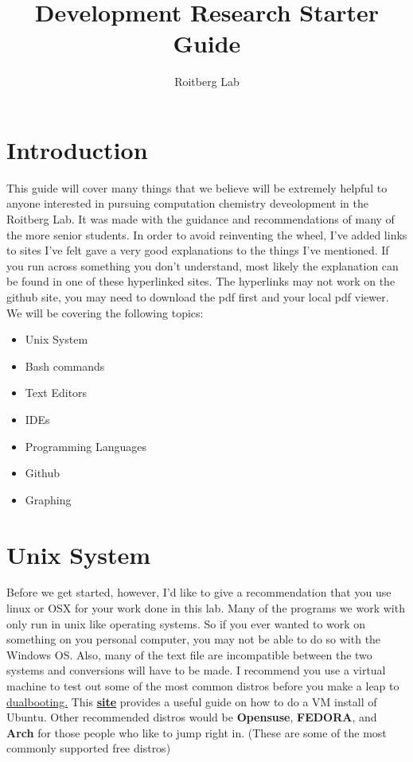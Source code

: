 \documentclass{article}
\begin{document}
\title{Development Research Starter Guide}
\author{Roitberg Lab}
\maketitle

\section*{Introduction}

This guide will cover many things that we believe will be extremely helpful to anyone interested in pursuing computation chemistry deveolopment in the Roitberg Lab. 
It was made with the guidance and recommendations of many of the more senior students. 
In order to avoid reinventing the wheel, I've added links to sites I've felt gave a very good explanations to the things I've mentioned.
If you run across something you don't understand, most likely the explanation can be found in one of these hyperlinked sites.
The hyperlinks may not work on the github site, you may need to download the pdf first and your local pdf viewer.
We will be covering the following topics: \\

\begin{itemize}
\item Unix System
\item Bash commands
\item Text Editors
\item IDEs
\item Programming Languages
\item Github
\item Graphing
\end{itemize}

\section*{Unix System}
Before we get started, however, I'd like to give a recommendation that you use linux or OSX for your work done in this lab. 
Many of the programs we work with only run in unix like operating systems.
So if you ever wanted to work on something on you personal computer, you may not be able to do so with the Windows OS. 
Also, many of the text file are incompatible between the two systems and conversions will have to be made.
I recommend you use a virtual machine to test out some of the most common distros before you make a leap to \href{https://help.ubuntu.com/community/WindowsDualBoot}{dualbooting.}
This \href{http://henricasanova.github.io/VirtualBoxUbuntuHowTo.html}{\textbf{site}} provides a useful guide on how to do a VM install of Ubuntu.
Other recommended distros would be \textbf{Opensuse}, \textbf{FEDORA}, and \textbf{Arch} for those people who like to jump right in. (These are some of the most commonly supported free distros)
\end{document}
